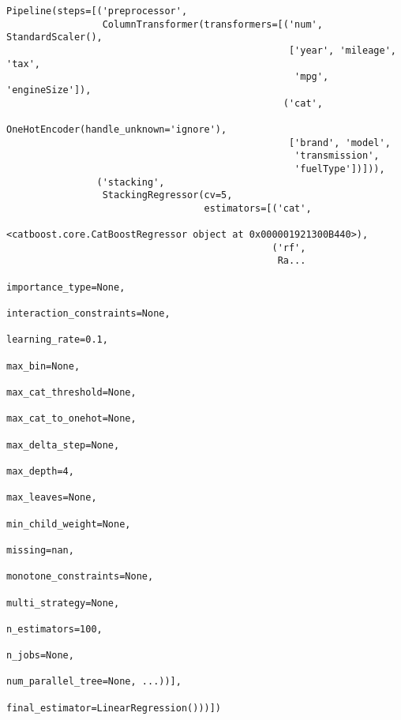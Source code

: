 \documentclass[
  letterpaper,
  DIV=11,
  numbers=noendperiod]{scrreprt}
\begin{document}
\begin{verbatim}
Pipeline(steps=[('preprocessor',
                 ColumnTransformer(transformers=[('num', StandardScaler(),
                                                  ['year', 'mileage', 'tax',
                                                   'mpg', 'engineSize']),
                                                 ('cat',
                                                  OneHotEncoder(handle_unknown='ignore'),
                                                  ['brand', 'model',
                                                   'transmission',
                                                   'fuelType'])])),
                ('stacking',
                 StackingRegressor(cv=5,
                                   estimators=[('cat',
                                                <catboost.core.CatBoostRegressor object at 0x000001921300B440>),
                                               ('rf',
                                                Ra...
                                                             importance_type=None,
                                                             interaction_constraints=None,
                                                             learning_rate=0.1,
                                                             max_bin=None,
                                                             max_cat_threshold=None,
                                                             max_cat_to_onehot=None,
                                                             max_delta_step=None,
                                                             max_depth=4,
                                                             max_leaves=None,
                                                             min_child_weight=None,
                                                             missing=nan,
                                                             monotone_constraints=None,
                                                             multi_strategy=None,
                                                             n_estimators=100,
                                                             n_jobs=None,
                                                             num_parallel_tree=None, ...))],
                                   final_estimator=LinearRegression()))])
\end{verbatim}
\end{document}
